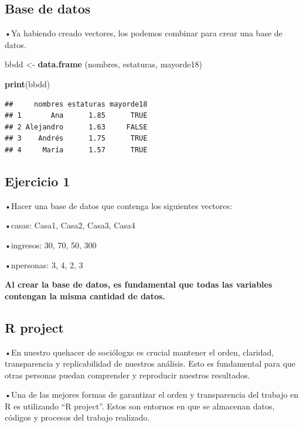 \documentclass[
]{article}
\newenvironment{Shaded}{\begin{snugshade}}{\end{snugshade}}
\newcommand{\FunctionTok}[1]{\textcolor[rgb]{0.13,0.29,0.53}{\textbf{#1}}}
\newcommand{\NormalTok}[1]{#1}
\newcommand{\OtherTok}[1]{\textcolor[rgb]{0.56,0.35,0.01}{#1}}
\begin{document}
\subsection{Base de datos}\label{base-de-datos}

•Ya habiendo creado vectores, los podemos combinar para crear una base
de datos.

\begin{Shaded}
\begin{Highlighting}[]
\NormalTok{bbdd }\OtherTok{\textless{}{-}} \FunctionTok{data.frame}\NormalTok{ (nombres, estaturas, mayorde18)}

\FunctionTok{print}\NormalTok{(bbdd)}
\end{Highlighting}
\end{Shaded}

\begin{verbatim}
##     nombres estaturas mayorde18
## 1       Ana      1.85      TRUE
## 2 Alejandro      1.63     FALSE
## 3    Andrés      1.75      TRUE
## 4     María      1.57      TRUE
\end{verbatim}

\subsection{Ejercicio 1}\label{ejercicio-1}

•Hacer una base de datos que contenga los siguientes vectores:

•casas: Casa1, Casa2, Casa3, Casa4

•ingresos: 30, 70, 50, 300

•npersonas: 3, 4, 2, 3

\textbf{Al crear la base de datos, es fundamental que todas las
variables contengan la misma cantidad de datos.}

\subsection{R project}\label{r-project}

•En nuestro quehacer de sociólogxs es crucial mantener el orden,
claridad, transparencia y replicabilidad de nuestros análisis. Esto es
fundamental para que otras personas puedan comprender y reproducir
nuestros resultados.

•Una de las mejores formas de garantizar el orden y transparencia del
trabajo en R es utilizando ``R project''. Estos son entornos en que se
almacenan datos, códigos y procesos del trabajo realizado.
\end{document}

